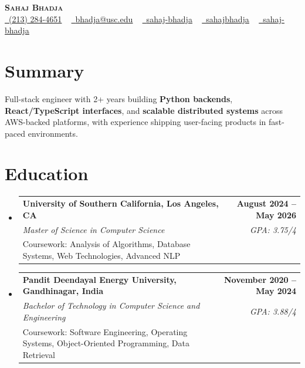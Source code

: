 \documentclass[letterpaper,10pt]{article}
\makeatletter
\newcommand{\resumeEduSubheading}[5]{\vspace{-1pt}\item\begin{tabular*}{1.0\textwidth}[t]{l@{\extracolsep{\fill}}r}\textbf{#1} & \textbf{\small #2} \\\textit{\small #3} & \textit{\small #4} \\\small #5 & \\\end{tabular*}\vspace{-4pt}}
\newcommand{\resumeSubHeadingListStart}{\begin{itemize}[leftmargin=0.0in, label={}]}
\newcommand{\resumeSubHeadingListEnd}{\end{itemize}}
\makeatother
\begin{document}
\begin{center}
{\Huge \scshape \textbf{Sahaj Bhadja}} \\ \vspace{1pt}
\small \href{tel:(213) 284-4651}{\faPhone\ \underline{(213) 284-4651}} ~ \href{mailto: bhadja@usc.edu}{\raisebox{-0.2\height}\faEnvelope\ \underline{bhadja@usc.edu}} ~
\href{https://www.linkedin.com/in/sahaj-bhadja/}{\raisebox{-0.2\height}\faLinkedin\ \underline{sahaj-bhadja}} ~ \href{https://github.com/SAHAJ-BHADJA}{\raisebox{-0.2\height}\faGithub\ \underline{sahajbhadja}} ~
\href{https://sahaj-bhadja.vercel.app/}{\raisebox{-0.2\height}\faGlobe\ \underline{sahaj-bhadja}}
\end{center}
\vspace{-18pt}
\section{Summary}
\begin{itemize}[leftmargin=0.15in, label={}]
\small{\item{Full-stack engineer with 2+ years building \textbf{Python backends}, \textbf{React/TypeScript interfaces}, and \textbf{scalable distributed systems} across AWS-backed platforms, with experience shipping user-facing products in fast-paced environments.}}
\end{itemize}
\vspace{-16pt}
\section{Education}
\resumeSubHeadingListStart
\resumeEduSubheading{University of Southern California, Los Angeles, CA}{August 2024 -- May 2026}{Master of Science in Computer Science}{GPA: 3.75/4}{Coursework: Analysis of Algorithms, Database Systems, Web Technologies, Advanced NLP}
\vspace{-9pt}
\resumeEduSubheading{Pandit Deendayal Energy University, Gandhinagar, India}{November 2020 -- May 2024}{Bachelor of Technology in Computer Science and Engineering}{GPA: 3.88/4}{Coursework: Software Engineering, Operating Systems, Object-Oriented Programming, Data Retrieval}
\resumeSubHeadingListEnd
\vspace{-14pt}
\end{document}
